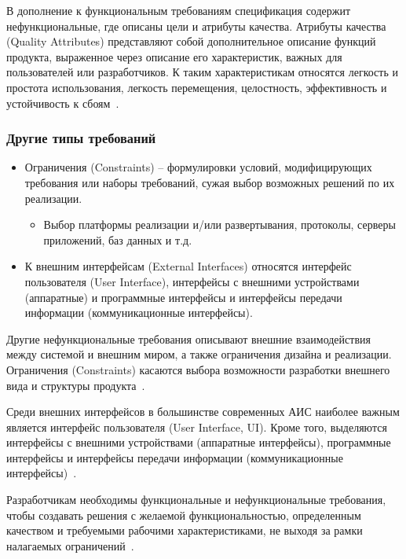 \documentclass{../industrial-development}
\begin{document}
В дополнение к функциональным требованиям спецификация содержит нефункциональные, где описаны цели и атрибуты качества. \alert{Атрибуты качества (Quality Attributes)} представляют собой дополнительное описание функций продукта, выраженное через описание его характеристик, важных для пользователей или разработчиков. К таким
характеристикам относятся легкость и простота использования, легкость перемещения, целостность, эффективность и устойчивость к сбоям~\cite[с.~10]{Wiegers}.

\begin{frame} \frametitle{Другие типы требований}
	\begin{itemize}

\item \alert{Ограничения (Constraints)} -- формулировки условий, модифицирующих требования или наборы требований, сужая выбор возможных решений по их реализации.
\begin{itemize}
	\item Выбор платформы реализации и/или развертывания, протоколы, серверы приложений, баз
данных и т.д.
\end{itemize}
\item К \alert{внешним интерфейсам (External Interfaces)} относятся интерфейс пользователя (User Interface), интерфейсы с внешними устройствами (аппаратные) и программные интерфейсы и интерфейсы передачи информации (коммуникационные интерфейсы).
	\end{itemize}

	\end{frame}

\lecturenotes

Другие нефункциональные требования описывают внешние
взаимодействия между системой и внешним миром, а также ограничения дизайна и реализации. \alert{Ограничения (Constraints)} касаются выбора
возможности разработки внешнего вида и структуры продукта~\cite[с.~10]{Wiegers}.

Среди \alert{внешних интерфейсов} в большинстве современных АИС наиболее важным является интерфейс пользователя (User Interface, UI). Кроме того, выделяются интерфейсы с внешними устройствами (аппаратные интерфейсы), программные интерфейсы и
интерфейсы передачи информации (коммуникационные интерфейсы)~\cite[с.~10]{Maglinec}.

Разработчикам необходимы функциональные и нефункциональные требования, чтобы создавать
решения с желаемой функциональностью, определенным качеством и требуемыми рабочими характеристиками, не выходя за рамки налагаемых ограничений~\cite[с.~11]{Wiegers}.
\end{document}
